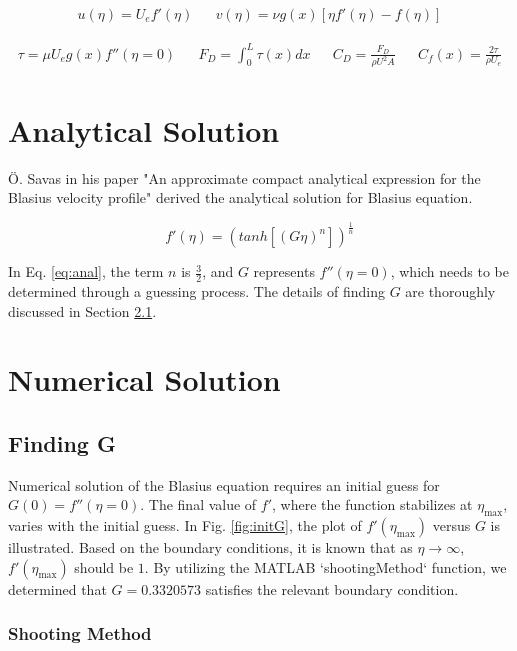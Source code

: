\documentclass[]{report}
\begin{document}
\begin{align}
\label{eq:finaluv}
    u(\eta) = U_e f'(\eta) && v(\eta) = \nu g(x) [\eta f'(\eta) - f(\eta)]
\end{align}

\begin{align}
\label{eq:firc}
    \tau =  \mu U_e g(x) f''(\eta=0) && F_D = \int_0^L \tau(x)dx
&&C_D  = \frac{F_D}{\rho U^2 A}  && C_f(x) = \frac{2\tau}{\rho U_e}
\end{align}


\chapter{Analytical Solution}
Ö. Savas in his paper "An approximate compact analytical expression for the Blasius velocity profile" \cite{SAVAS20123772} derived the analytical solution for Blasius equation.

\begin{equation}
\label{eq:anal}
    f'(\eta) = (tanh[(G\eta)^n])^{\frac{1}{n}}
\end{equation}

In Eq. \ref{eq:anal}, the term $n$ is $\frac{3}{2}$, and $G$ represents $f''(\eta=0)$, which needs to be determined through a guessing process. The details of finding $G$ are thoroughly discussed in Section \ref{sec:find_G}.
\newpage
\chapter{Numerical Solution}

\section{Finding G}
\label{sec:find_G}

Numerical solution of the Blasius equation requires an initial guess for $G(0) = f''(\eta=0)$. The final value of $f'$, where the function stabilizes at $\eta_{\text{max}}$, varies with the initial guess. In Fig. \ref{fig:initG}, the plot of $f'(\eta_{\text{max}})$ versus $G$ is illustrated. Based on the boundary conditions, it is known that as $\eta \longrightarrow \infty$, $f'(\eta_{\text{max}})$ should be $1$. By utilizing the MATLAB\cite{MATLAB} `shootingMethod` function, we determined that $G = 0.3320573$ satisfies the relevant boundary condition.

\subsection{Shooting Method}
\end{document}

